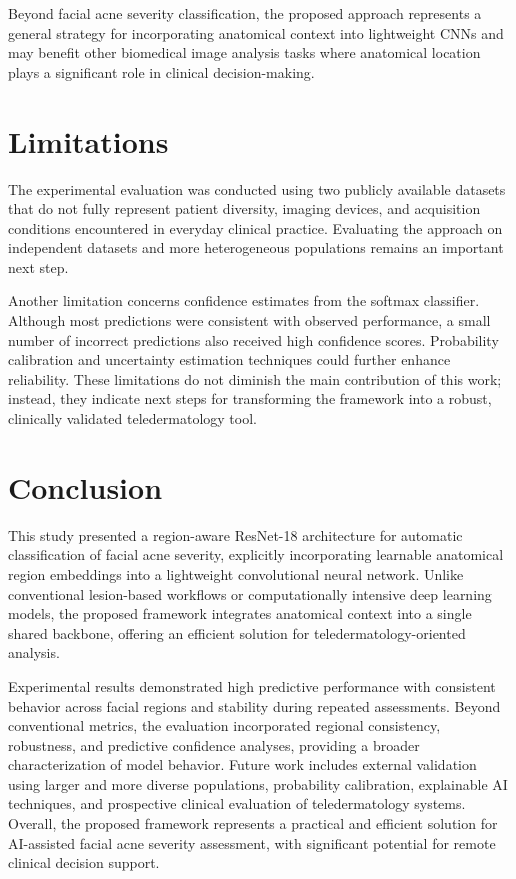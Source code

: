 \documentclass[conference]{IEEEtran}
\begin{document}
Beyond facial acne severity classification, the proposed approach represents a general strategy for incorporating anatomical context into lightweight CNNs and may benefit other biomedical image analysis tasks where anatomical location plays a significant role in clinical decision-making.

\section{Limitations}
The experimental evaluation was conducted using two publicly available datasets that do not fully represent patient diversity, imaging devices, and acquisition conditions encountered in everyday clinical practice. Evaluating the approach on independent datasets and more heterogeneous populations remains an important next step.

Another limitation concerns confidence estimates from the softmax classifier. Although most predictions were consistent with observed performance, a small number of incorrect predictions also received high confidence scores. Probability calibration and uncertainty estimation techniques could further enhance reliability. These limitations do not diminish the main contribution of this work; instead, they indicate next steps for transforming the framework into a robust, clinically validated teledermatology tool.

\section{Conclusion}
This study presented a region-aware ResNet-18 architecture for automatic classification of facial acne severity, explicitly incorporating learnable anatomical region embeddings into a lightweight convolutional neural network. Unlike conventional lesion-based workflows or computationally intensive deep learning models, the proposed framework integrates anatomical context into a single shared backbone, offering an efficient solution for teledermatology-oriented analysis.

Experimental results demonstrated high predictive performance with consistent behavior across facial regions and stability during repeated assessments. Beyond conventional metrics, the evaluation incorporated regional consistency, robustness, and predictive confidence analyses, providing a broader characterization of model behavior. Future work includes external validation using larger and more diverse populations, probability calibration, explainable AI techniques, and prospective clinical evaluation of teledermatology systems. Overall, the proposed framework represents a practical and efficient solution for AI-assisted facial acne severity assessment, with significant potential for remote clinical decision support.
\end{document}
